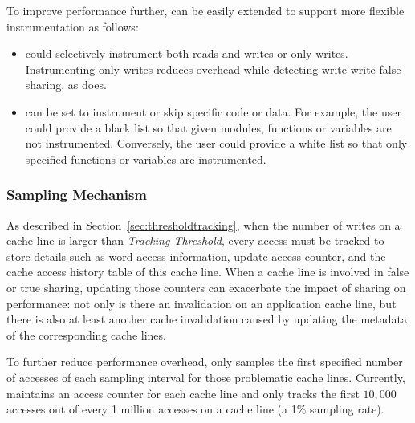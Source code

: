 To improve performance further,
\Predator{} can be easily extended to support more flexible instrumentation as follows:
\begin{itemize}
\item
\Predator{} could selectively instrument both reads and writes or only writes.
Instrumenting only writes reduces overhead while detecting write-write false sharing, 
as \Sheriff{} does. 
\item
\Predator{} can be set to instrument or skip specific code or data. 
For example, the user could provide a black list so that given modules,
functions or variables are not instrumented. 
Conversely, the user could provide a white list so that only specified functions or variables are instrumented. 
\end{itemize}

\subsubsection{Sampling Mechanism}
\label{sec:sample}
As described in Section~\ref{sec:thresholdtracking}, when the number of
writes on a cache line is larger than {\it Tracking-Threshold}, every
access must be tracked to store details such as word access
information, update access counter, and the cache access history table
of this cache line.  When a cache line is involved in false or true
sharing, updating those counters can exacerbate the impact of sharing
on performance: not only is there an invalidation on an application
cache line, but there is also at least another cache invalidation
caused by updating the metadata of the corresponding cache lines.

To further reduce performance overhead, \Predator{} only samples the first specified
number of accesses of each sampling interval for those problematic cache lines. 
Currently, \Predator{} maintains an access counter for each cache line
and only tracks the first $10,000$ accesses out of every 1 million
accesses on a cache line (a 1\% sampling rate).

